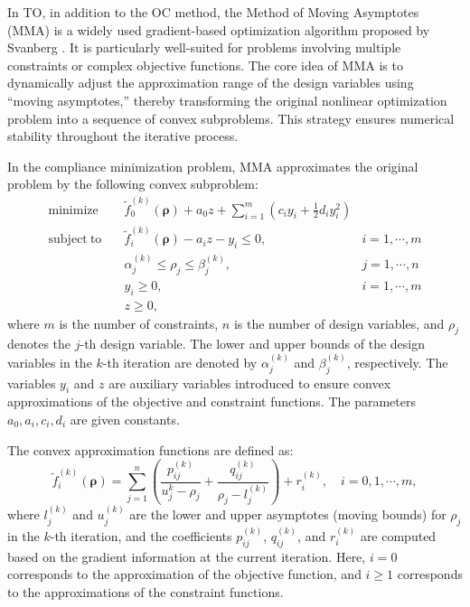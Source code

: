 \documentclass[mathpazo]{cicp}
\begin{document}
In TO, in addition to the OC method, the Method of Moving Asymptotes (MMA) is a widely used gradient-based optimization algorithm proposed by Svanberg \cite{svanberg1987method}. It is particularly well-suited for problems involving multiple constraints or complex objective functions. The core idea of MMA is to dynamically adjust the approximation range of the design variables using “moving asymptotes,” thereby transforming the original nonlinear optimization problem into a sequence of convex subproblems. This strategy ensures numerical stability throughout the iterative process.

In the compliance minimization problem, MMA approximates the original problem by the following convex subproblem:
\begin{equation*}
	\begin{aligned}
		\mathrm{minimize}\quad&\tilde{f}_0^{(k)}(\boldsymbol{\rho}) + a_0z + \sum_{i=1}^m(c_iy_i+\frac{1}{2}d_iy_i^2)\\
		\mathrm{subject~to}\quad&\tilde{f}_i^{(k)}(\boldsymbol{\rho}) - a_iz - y_i \leq 0,\quad&{i}=1,\cdots,m\\
		\quad&\alpha_j^{(k)}\leq{\rho}_j\leq\beta_j^{(k)},\quad&{j}=1,\cdots,n\\
		\quad&{y}_i\geq0,\quad&i=1,\cdots,m\\
		\quad&{z}\geq0,
	\end{aligned}
\end{equation*}
where $m$ is the number of constraints, $n$ is the number of design variables, and $\rho_j$ denotes the $j$-th design variable. The lower and upper bounds of the design variables in the $k$-th iteration are denoted by $\alpha_j^{(k)}$ and $\beta_j^{(k)}$, respectively. The variables $y_i$ and $z$ are auxiliary variables introduced to ensure convex approximations of the objective and constraint functions. The parameters $a_0, a_i, c_i, d_i$ are given constants. 

The convex approximation functions are defined as: 
\begin{equation*}
	\tilde{f}_i^{(k)}(\boldsymbol{\rho}) = \sum_{j=1}^n\left(\frac{p_{ij}^{(k)}}{u_{j}^k-\rho_j} + \frac{q_{ij}^{(k)}}{\rho_{j}-l_j^{(k)}}\right) + r_i^{(k)},\quad{i}=0,1,\cdots,m,
\end{equation*}
where $l_j^{(k)}$ and $u_j^{(k)}$ are the lower and upper asymptotes (moving bounds) for $\rho_j$ in the $k$-th iteration, and the coefficients $p_{ij}^{(k)}$, $q_{ij}^{(k)}$, and $r_i^{(k)}$ are computed based on the gradient information at the current iteration. Here, $i = 0$ corresponds to the approximation of the objective function, and $i \geq 1$ corresponds to the approximations of the constraint functions.
\end{document}
